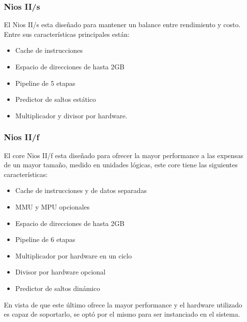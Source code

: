 \subsubsection{Nios II/s}
El Nios II/s esta diseñado para mantener un balance entre rendimiento y costo. Entre sus características principales están:

\begin{itemize}
	\item Cache de instrucciones
	\item Espacio de direcciones de hasta 2GB
	\item Pipeline de 5 etapas
	\item Predictor de saltos estático
	\item Multiplicador y divisor por hardware. 
\end{itemize}

\subsubsection{Nios II/f}
El core Nios II/f esta diseñado para ofrecer la mayor performance a las expensas de un mayor tamaño, medido en unidades lógicas, este core tiene las siguientes características:

\begin{itemize}
	\item Cache de instrucciones y de datos separadas
	\item MMU y MPU opcionales
	\item Espacio de direcciones de hasta 2GB
	\item Pipeline de 6 etapas
	\item Multiplicador por hardware en un ciclo
	\item Divisor por hardware opcional
	\item Predictor de saltos dinámico
\end{itemize}

En vista de que este último ofrece la mayor performance y el hardware utilizado es capaz de soportarlo, se optó por el mismo para ser instanciado en el sistema.
